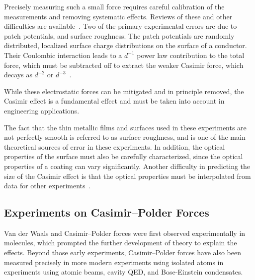Precisely measuring such a small force requires careful calibration of the measurements 
and removing systematic effects.  Reviews of these and other difficulties are available~\citep{Lamoreaux2011, vanZwol2011, Bordag2009}.
Two of the primary experimental errors are due to 
patch potentials, and surface roughness.  
The patch potentials are randomly distributed, localized surface charge distributions on the surface of a conductor.  
Their Coulombic interaction leads to a $d^{-1}$ power law contribution to the total force, 
which must be subtracted off to extract the weaker Casimir force, which decays as $d^{-2}$ or $d^{-3}$~\citep{Sushkov2011}.  

 While these electrostatic forces can be mitigated and in principle removed, the Casimir effect is a fundamental 
 effect and must be taken into account in engineering applications.  

The fact that the thin metallic films and surfaces used in these 
experiments are not perfectly smooth is referred to as surface roughness, and is one of 
the main theoretical sources of error in these experiments.  
In addition, the optical properties of the surface must also be carefully characterized, since the 
optical properties of a coating can vary significantly.  Another difficulty in predicting the size of the 
Casimir effect is that the optical properties must be interpolated from data for other experiments~\citep{vanZwol2011}.

\subsection{Experiments on Casimir--Polder Forces}

Van der Waals and Casimir--Polder forces were first observed experimentally in molecules, 
which prompted the further development of theory to explain the effects.  
Beyond those early experiments, Casimir--Polder forces have also been measured precisely in more modern experiments  
using isolated atoms in experiments using atomic beams, cavity QED, and Bose-Einstein condensates.  


